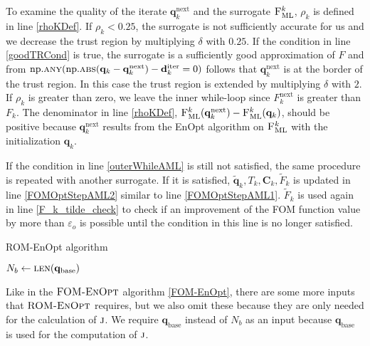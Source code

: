 To examine the quality of the iterate $\mathbf{q}^\mathrm{next}_k$ and the surrogate $\textproc{F$_\mathrm{ML}^k$}$, $\rho_k$ is defined in line \ref{rhoKDef}. If $\rho_k<0.25$, the surrogate is not sufficiently accurate for us and we decrease the trust region by multiplying $\delta$ with $0.25$. If the condition in line \ref{goodTRCond} is true, the surrogate is a sufficiently good approximation of $F$ and from $\mathrm{np.}\Call{any}{\mathrm{np.}\protect\Call{abs}{\mathbf{q}_k-\mathbf{q}^\mathrm{next}_k}-\mathbf{d}^\mathrm{iter}_k = 0}$ follows that $\mathbf{q}^\mathrm{next}_k$ is at the border of the trust region. In this case the trust region is extended by multiplying $\delta$ with $2$. If $\rho_k$ is greater than zero, we leave the inner while-loop since $F^\mathrm{next}_k$ is greater than $F_k$. The denominator in line \ref{rhoKDef}, $\Call{F$_\mathrm{ML}^k$}{\mathbf{q}^\mathrm{next}_k}-\Call{F$_\mathrm{ML}^k$}{\mathbf{q}_k}$, should be positive because $\mathbf{q}^\mathrm{next}_k$ results from the EnOpt algorithm on $\textproc{F$_\mathrm{ML}^k$}$ with the initialization $\mathbf{q}_k$.

If the condition in line \ref{outerWhileAML} is still not satisfied, the same procedure is repeated with another surrogate. If it is satisfied, $\tilde{\mathbf{q}}_k,T_k,\mathbf{C}_k,\tilde{F}_k$ is updated in line \ref{FOMOptStepAML2} similar to line \ref{FOMOptStepAML1}. $\tilde{F}_k$ is used again in line \ref{F_k_tilde_check} to check if an improvement of the FOM function value by more than $\varepsilon_o$ is possible until the condition in this line is no longer satisfied.

\begin{algorithm}[H]%
\caption{\label{ROM-EnOpt}ROM-EnOpt algorithm}
\begin{algorithmic}[1]
\State $N_b\gets \Call{len}{\mathbf{q}_\mathrm{base}}$
\State \Return {}
\EndFunction
\end{algorithmic}
\end{algorithm}

Like in the $\textproc{FOM-EnOpt}$ algorithm \ref{FOM-EnOpt}, there are some more inputs that $\textproc{ROM-EnOpt}$ requires, but we also omit these because they are only needed for the calculation of $\textproc{j}$. We require $\mathbf{q}_\mathrm{base}$ instead of $N_b$ as an input because $\mathbf{q}_\mathrm{base}$ is used for the computation of $\textproc{j}$.